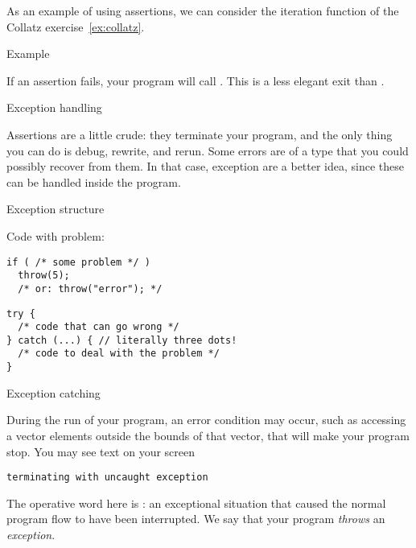 As an example of using assertions, we can consider the iteration function
of the Collatz exercise~\ref{ex:collatz}.

\begin{block}{Example}
  \label{sl:collatzassert}
\end{block}

\begin{remark}
  If an assertion fails, your program
  will call .
  This is a less elegant exit than .
\end{remark}

 {Exception handling}
\label{sec:exception}

Assertions are a little crude: they terminate your program,
and the only thing you can do is debug, rewrite, and rerun.
Some errors are of a type that you could possibly recover from them.
In that case, exception are a better idea,
since these can be handled inside the program.

\begin{block}{Exception structure}
  \label{sl:except-structure}
\begin{multicols}{2}
Code with problem:
\begin{lstlisting}
if ( /* some problem */ )
  throw(5); 
  /* or: throw("error"); */
\end{lstlisting}
\vfill\columnbreak
\begin{lstlisting}
try {
  /* code that can go wrong */
} catch (...) { // literally three dots!
  /* code to deal with the problem */
}
\end{lstlisting}
\end{multicols}
\end{block}

 {Exception catching}

During the run of your program, an error condition may occur,
such as accessing a vector elements outside the bounds of that vector,
that will make your program stop.
You may see text on your screen
\begin{verbatim}
terminating with uncaught exception
\end{verbatim}
The operative word here is :
an exceptional situation that caused the normal program flow
to have been interrupted. We say that your program
\emph{throws} an \emph{exception}.


